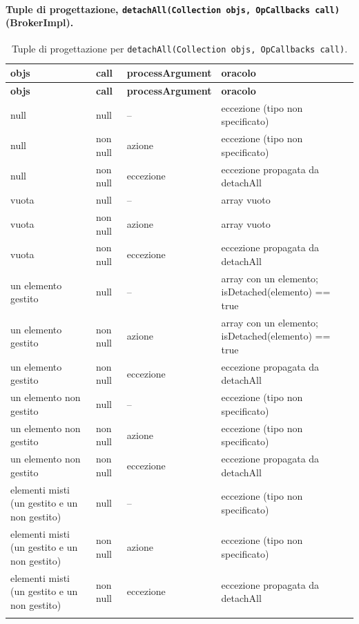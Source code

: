 \paragraph*{Tuple di progettazione, \texttt{detachAll(Collection objs, OpCallbacks call)} (BrokerImpl).}

{\footnotesize\setlength{\tabcolsep}{3pt}
\begin{longtable}{>{\raggedright\arraybackslash}p{}>{\raggedright\arraybackslash}p{}>{\raggedright\arraybackslash}p{}>{\raggedright\arraybackslash}p{}}
\toprule
\textbf{objs} & \textbf{call} & \textbf{processArgument} & \textbf{oracolo} \\
\midrule
\endfirsthead
\toprule
\textbf{objs} & \textbf{call} & \textbf{processArgument} & \textbf{oracolo} \\
\midrule
\endhead
\bottomrule
\endfoot
null & null & -- & eccezione (tipo non specificato) \\
null & non null & azione & eccezione (tipo non specificato) \\
null & non null & eccezione & eccezione propagata da detachAll \\
vuota & null & -- & array vuoto \\
vuota & non null & azione & array vuoto \\
vuota & non null & eccezione & eccezione propagata da detachAll \\
un elemento gestito & null & -- & array con un elemento; isDetached(elemento) == true \\
un elemento gestito & non null & azione & array con un elemento; isDetached(elemento) == true \\
un elemento gestito & non null & eccezione & eccezione propagata da detachAll \\
un elemento non gestito & null & -- & eccezione (tipo non specificato) \\
un elemento non gestito & non null & azione & eccezione (tipo non specificato) \\
un elemento non gestito & non null & eccezione & eccezione propagata da detachAll \\
elementi misti (un gestito e un non gestito) & null & -- & eccezione (tipo non specificato) \\
elementi misti (un gestito e un non gestito) & non null & azione & eccezione (tipo non specificato) \\
elementi misti (un gestito e un non gestito) & non null & eccezione & eccezione propagata da detachAll \\
\bottomrule
\caption{Tuple di progettazione per \texttt{detachAll(Collection objs, OpCallbacks call)}.}
\label{tab:detachall-tuple}
\end{longtable}
}



